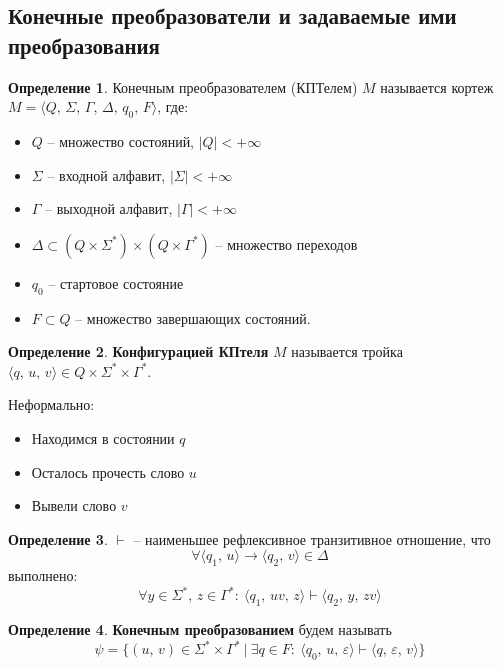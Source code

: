 \documentclass[a4paper,12pt]{article}
\theoremstyle{plain}
\theoremstyle{definition}
\newtheorem{definition}{Определение}[subsection]
\theoremstyle{remark}
\begin{document}
\subsection{Конечные преобразователи и задаваемые ими преобразования}
\begin{definition}
	Конечным преобразователем (КПТелем) $M$ называется кортеж $M = \langle Q,\,\Sigma,\,\Gamma,\,\Delta,\, q_0,\, F\rangle$, где:
	\begin{itemize}
		\item $Q$ -- множество состояний, $\vert Q\vert < +\infty$
		\item $\Sigma$ -- входной алфавит, $\vert \Sigma\vert < +\infty$
		\item $\Gamma$ -- выходной алфавит, $\vert \Gamma\vert < +\infty$
		\item $\Delta \subset (Q \times \Sigma^*) \times (Q \times \Gamma^*)$ -- множество переходов
		\item $q_0$ -- стартовое состояние
		\item $F \subset Q$ -- множество завершающих состояний.
	\end{itemize}
\end{definition}

\begin{definition}
	\textbf{Конфигурацией КПтеля} $M$ называется тройка $\langle q,\,u,\,v\rangle \in Q \times \Sigma^* \times \Gamma^*$.

	Неформально:
	\begin{itemize}
		\item Находимся в состоянии $q$
		\item Осталось прочесть слово $u$
		\item Вывели слово $v$
	\end{itemize}
\end{definition}

\begin{definition}
	$\vdash$ -- наименьшее рефлексивное транзитивное отношение, что
	\[
		\forall \langle q_1,\,u\rangle \to\langle q_2,\, v\rangle \in \Delta
	\]
	выполнено:
	\[
		\forall y \in \Sigma^*,\, z \in \Gamma^* :\: \langle q_1,\, uv,\,z\rangle\vdash\langle q_2,\,y,\,zv\rangle
	\]
\end{definition}

\begin{definition}
	\textbf{Конечным преобразованием} будем называть
	\[
		\psi = \{(u,\,v) \in \Sigma^*\times\Gamma^* \:\vert\: \exists q \in F :\: \langle q_0,\,u,\,\varepsilon\rangle \vdash \langle q,\,\varepsilon,\,v\rangle\}
	\]
\end{definition}
\end{document}
